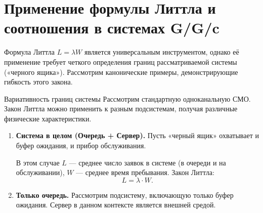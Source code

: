 \section{Применение формулы Литтла и соотношения в системах G/G/c}

Формула Литтла $L = \lambda W$ является универсальным инструментом, однако её применение требует четкого определения границ рассматриваемой системы («черного ящика»). Рассмотрим канонические примеры, демонстрирующие гибкость этого закона.

\begin{example}{Вариативность границ системы}
Рассмотрим стандартную одноканальную СМО. Закон Литтла можно применить к разным подсистемам, получая различные физические характеристики.

\begin{enumerate}
    \item \textbf{Система в целом (Очередь + Сервер).}
    Пусть «черный ящик» охватывает и буфер ожидания, и прибор обслуживания.
    
    \begin{center}
    \end{center}
    В этом случае $L$ — среднее число заявок в системе (в очереди и на обслуживании), $W$ — среднее время пребывания. Закон Литтла:
    $$ L = \lambda \cdot W. $$

    \item \textbf{Только очередь.}
    Рассмотрим подсистему, включающую только буфер ожидания. Сервер в данном контексте является внешней средой.
    
    \begin{center}
\end{center}
\end{enumerate}
\end{example}
